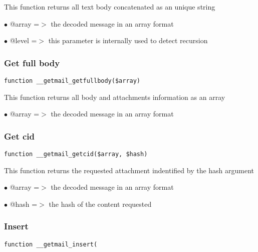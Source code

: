 \documentclass[a4paper]{article}
\begin{document}
This function returns all text body concatenated as an unique string

\begin{compactitem}
\item[\color{myblue}$\bullet$] @array =$>$ the decoded message in an array format
\item[\color{myblue}$\bullet$] @level =$>$ this parameter is internally used to detect recursion
\end{compactitem}

\hypertarget{toc48}{}
\subsubsection{Get full body}

\begin{lstlisting}
function __getmail_getfullbody($array)
\end{lstlisting}

This function returns all body and attachments information as an array

\begin{compactitem}
\item[\color{myblue}$\bullet$] @array =$>$ the decoded message in an array format
\end{compactitem}

\hypertarget{toc49}{}
\subsubsection{Get cid}

\begin{lstlisting}
function __getmail_getcid($array, $hash)
\end{lstlisting}

This function returns the requested attachment indentified by the hash argument

\begin{compactitem}
\item[\color{myblue}$\bullet$] @array =$>$ the decoded message in an array format
\item[\color{myblue}$\bullet$] @hash  =$>$ the hash of the content requested
\end{compactitem}

\hypertarget{toc50}{}
\subsubsection{Insert}

\begin{lstlisting}
function __getmail_insert(
\end{lstlisting}
\end{document}
